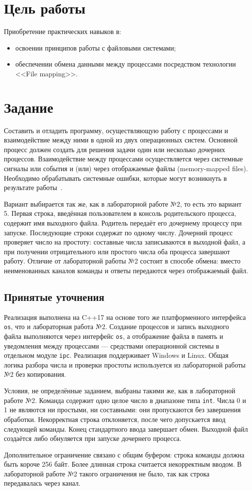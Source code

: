\section{Цель работы}
Приобретение практических навыков в:
\begin{itemize}
\item освоении принципов работы с файловыми системами;
\item обеспечении обмена данными между процессами посредством технологии <<File mapping>>.
\end{itemize}

\section{Задание}
Составить и отладить программу, осуществляющую работу с процессами и взаимодействие между ними в одной из двух операционных систем. Основной процесс должен создать для решения задачи один или несколько дочерних процессов. Взаимодействие между процессами осуществляется через системные сигналы или события и (или) через отображаемые файлы (memory-mapped files). Необходимо обрабатывать системные ошибки, которые могут возникнуть в результате работы~\cite{task}.

Вариант выбирается так же, как в лабораторной работе №2, то есть это вариант 5. Первая строка, введённая пользователем в консоль родительского процесса, содержит имя выходного файла. Родитель передаёт его дочернему процессу при запуске. Последующие строки содержат по одному числу. Дочерний процесс проверяет число на простоту: составные числа записываются в выходной файл, а при получении отрицательного или простого числа оба процесса завершают работу. Отличие от лабораторной работы №2 состоит в способе обмена: вместо неименованных каналов команды и ответы передаются через отображаемый файл.

\subsection{Принятые уточнения}
Реализация выполнена на C++17 на основе того же платформенного интерфейса \texttt{os}, что и лабораторная работа №2. Создание процессов и запись выходного файла выполняются через интерфейс \texttt{os}, а отображение файла в память и уведомления между процессами --- средствами операционной системы в отдельном модуле \texttt{ipc}. Реализация поддерживает Windows и Linux. Общая логика разбора числа и проверки простоты используется из лабораторной работы №2 без копирования.

Условия, не определённые заданием, выбраны такими же, как в лабораторной работе №2. Команда содержит одно целое число в диапазоне типа \texttt{int}. Числа 0 и 1 не являются ни простыми, ни составными: они пропускаются без завершения обработки. Некорректная строка отклоняется, после чего допускается ввод следующей команды. Конец стандартного ввода завершает обмен. Выходной файл создаётся либо обнуляется при запуске дочернего процесса.

Дополнительное ограничение связано с общим буфером: строка команды должна быть короче 256 байт. Более длинная строка считается некорректным вводом. В лабораторной работе №2 такого ограничения не было, так как строка передавалась через канал.
